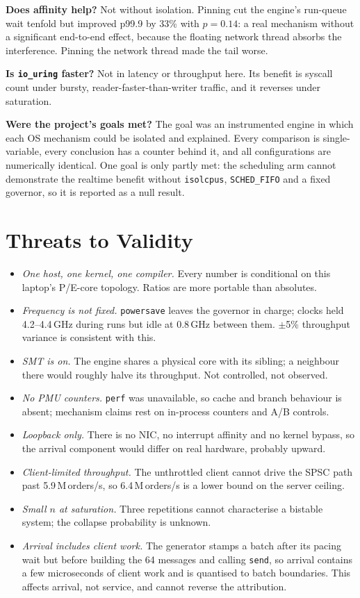 \documentclass[conference]{IEEEtran}
\newcommand{\Mops}{\,M\,orders/s}
\begin{document}
\textbf{Does affinity help?} Not without isolation. Pinning cut the engine's
run-queue wait tenfold but improved p99.9 by 33\% with $p=0.14$: a real mechanism
without a significant end-to-end effect, because the floating network thread
absorbs the interference. Pinning the network thread made the tail worse.

\textbf{Is \texttt{io\_uring} faster?} Not in latency or throughput here. Its
benefit is syscall count under bursty, reader-faster-than-writer traffic, and it
reverses under saturation.

\textbf{Were the project's goals met?} The goal was an instrumented engine in
which each OS mechanism could be isolated and explained. Every comparison is
single-variable, every conclusion has a counter behind it, and all
configurations are numerically identical. One goal is only partly met: the
scheduling arm cannot demonstrate the realtime benefit without
\texttt{isolcpus}, \texttt{SCHED\_FIFO} and a fixed governor, so it is reported
as a null result.

\section{Threats to Validity}

\begin{itemize}
\item \emph{One host, one kernel, one compiler.} Every number is conditional on
this laptop's P/E-core topology. Ratios are more portable than absolutes.
\item \emph{Frequency is not fixed.} \texttt{powersave} leaves the governor in
charge; clocks held 4.2--4.4\,GHz during runs but idle at 0.8\,GHz between them.
$\pm$5\% throughput variance is consistent with this.
\item \emph{SMT is on.} The engine shares a physical core with its sibling; a
neighbour there would roughly halve its throughput. Not controlled, not observed.
\item \emph{No PMU counters.} \texttt{perf} was unavailable, so cache and branch
behaviour is absent; mechanism claims rest on in-process counters and A/B
controls.
\item \emph{Loopback only.} There is no NIC, no interrupt affinity and no kernel
bypass, so the arrival component would differ on real hardware, probably upward.
\item \emph{Client-limited throughput.} The unthrottled client cannot drive the
SPSC path past 5.9\Mops, so 6.4\Mops{} is a lower bound on the server ceiling.
\item \emph{Small $n$ at saturation.} Three repetitions cannot characterise a
bistable system; the collapse probability is unknown.
\item \emph{Arrival includes client work.} The generator stamps a batch after its
pacing wait but before building the 64 messages and calling \texttt{send}, so
arrival contains a few microseconds of client work and is quantised to batch
boundaries. This affects arrival, not service, and cannot reverse the
attribution.
\end{itemize}
\end{document}
